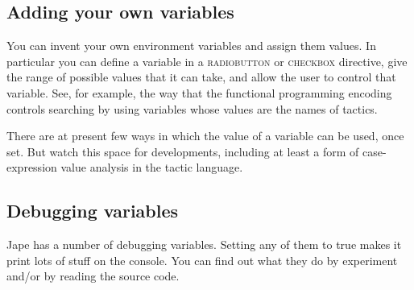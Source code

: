 \subsection{Adding your own variables}


You can invent your own environment variables and assign them values. In particular you can define a variable in a \textsc{radiobutton} or \textsc{checkbox} directive, give the range of possible values that it can take, and allow the user to control that variable. See, for example, the way that the functional programming encoding controls searching by using variables whose values are the names of tactics.


There are at present few ways in which the value of a variable can be used, once set. But watch this space for developments, including at least a form of case-expression value analysis in the tactic language.


\subsection{Debugging variables}


Jape has a number of debugging variables. Setting any of them to true makes it print lots of stuff on the console. You can find out what they do by experiment and/or by reading the source code.

 